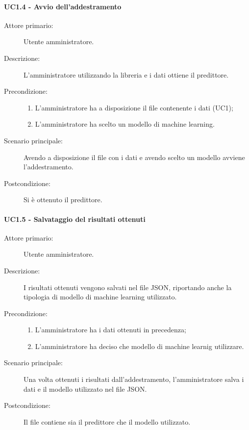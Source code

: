\paragraph{UC1.4 - Avvio dell'addestramento}
\label{sssec:uc1.4}
\begin{description}
  \item[Attore primario:] Utente amministratore.
  \item[Descrizione:] L'amministratore utilizzando la libreria e i dati ottiene il predittore.
  \item[Precondizione:]
  \begin{enumerate}
    \item L'amministratore ha a disposizione il file contenente i dati (UC1);
    \item L'amministratore ha scelto un modello di machine learning.
  \end{enumerate}
  \item[Scenario principale:] Avendo a disposizione il file con i dati e avendo scelto un modello avviene l'addestramento.
  \item[Postcondizione:] Si è ottenuto il predittore.
\end{description}

\paragraph{UC1.5 - Salvataggio del risultati ottenuti}
\label{sssec:uc1.5}
\begin{description}
  \item[Attore primario:] Utente amministratore.
  \item[Descrizione:] I risultati ottenuti vengono salvati nel file JSON, riportando anche la tipologia di modello di machine learning utilizzato.
  \item[Precondizione:]
  \begin{enumerate}
    \item L'amministratore ha i dati ottenuti in precedenza;
    \item L'amministratore ha deciso che modello di machine learnig  utilizzare.
  \end{enumerate}
  \item[Scenario principale:] Una volta ottenuti i risultati dall'addestramento, l'amministratore salva i dati e il modello utilizzato nel file JSON.
  \item[Postcondizione:] Il file contiene sia il predittore che il modello utilizzato.
\end{description}
